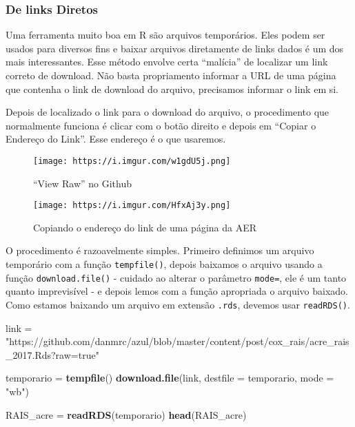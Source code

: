 \documentclass[]{article}
\newenvironment{Shaded}{\begin{snugshade}}{\end{snugshade}}
\newcommand{\KeywordTok}[1]{\textcolor[rgb]{0.13,0.29,0.53}{\textbf{#1}}}
\newcommand{\DataTypeTok}[1]{\textcolor[rgb]{0.13,0.29,0.53}{#1}}
\newcommand{\StringTok}[1]{\textcolor[rgb]{0.31,0.60,0.02}{#1}}
\newcommand{\NormalTok}[1]{#1}
\begin{document}
\subsubsection{De links Diretos}\label{de-links-diretos}

Uma ferramenta muito boa em R são arquivos temporários. Eles podem ser
usados para diversos fins e baixar arquivos diretamente de links dados é
um dos mais interessantes. Esse método envolve certa ``malícia'' de
localizar um link correto de download. Não basta propriamento informar a
URL de uma página que contenha o link de download do arquivo, precisamos
informar o link em si.

Depois de localizado o link para o download do arquivo, o procedimento
que normalmente funciona é clicar com o botão direito e depois em
``Copiar o Endereço do Link''. Esse endereço é o que usaremos.

\begin{figure}
\centering
\texttt{[image: https://i.imgur.com/w1gdU5j.png]}
\caption{``View Raw'' no Github}
\end{figure}

\begin{figure}
\centering
\texttt{[image: https://i.imgur.com/HfxAj3y.png]}
\caption{Copiando o endereço do link de uma página da AER}
\end{figure}

O procedimento é razoavelmente simples. Primeiro definimos um arquivo
temporário com a função \texttt{tempfile()}, depois baixamos o arquivo
usando a função \texttt{download.file()} - cuidado ao alterar o
parâmetro \texttt{mode=}, ele é um tanto quanto imprevisível - e depois
lemos com a função apropriada o arquivo baixado. Como estamos baixando
um arquivo em extensão \texttt{.rds}, devemos usar \texttt{readRDS()}.

\begin{Shaded}
\begin{Highlighting}[]
\NormalTok{link =}\StringTok{ "https://github.com/danmrc/azul/blob/master/content/post/cox_rais/acre_rais_2017.Rds?raw=true"}

\NormalTok{temporario =}\StringTok{ }\KeywordTok{tempfile}\NormalTok{()}
\KeywordTok{download.file}\NormalTok{(link, }\DataTypeTok{destfile =}\NormalTok{ temporario, }\DataTypeTok{mode =} \StringTok{"wb"}\NormalTok{)}

\NormalTok{RAIS_acre =}\StringTok{ }\KeywordTok{readRDS}\NormalTok{(temporario)}
\KeywordTok{head}\NormalTok{(RAIS_acre)}
\end{Highlighting}
\end{Shaded}
\end{document}
